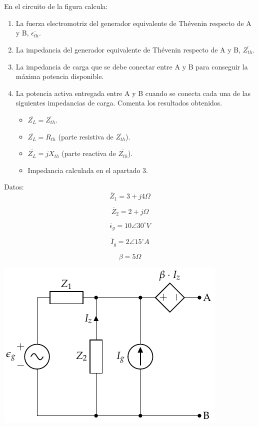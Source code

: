 \documentclass[12pt]{article}
\begin{document}
\clearpage

\section{}

En el circuito de la figura calcula:

\begin{enumerate}
\item La fuerza electromotriz del generador equivalente de Thévenin respecto de A y B,  \(\overline{\epsilon_{th}}\).
\item La impedancia del generador equivalente de Thévenin respecto de A y B, \(\overline{Z_{th}}\).
\item La impedancia de carga que se debe conectar entre A y B para conseguir la máxima potencia disponible.
\item La potencia activa entregada entre A y B cuando se conecta cada una de las siguientes impedancias de carga. Comenta los resultados obtenidos.
\begin{itemize}
\item \(\overline{Z_L} = \overline{Z_{th}}\).
\item \(\overline{Z_L} = R_{th}\) (parte resistiva de \(\overline{Z_{th}}\)).
\item \(\overline{Z_L} = j X_{th}\) (parte reactiva de \(\overline{Z_{th}}\)).
\item Impedancia calculada en el apartado 3.
\end{itemize}
\end{enumerate}

\begin{minipage}{0.3\linewidth}
Datos:
\[
\overline{Z}_1 = 3 + j4\Omega
\]

\[
\overline{Z}_2 = 2 + j\Omega
\]

\[
\overline{\epsilon}_g = 10\angle 30^{\circ} V 
\]

\[
\overline{I}_g = 2\angle 15^{\circ} A
\]

\[
\beta = 5 \Omega
\]
\end{minipage}
\begin{minipage}{0.7\linewidth}
\includegraphics[width=.9\linewidth]{figs/theveninExt.pdf}
\end{minipage}
\end{document}
